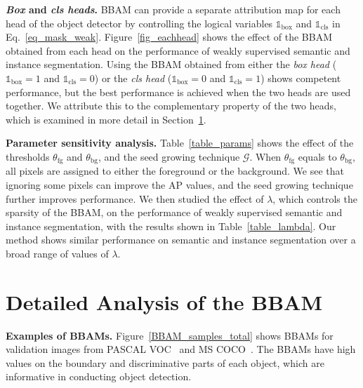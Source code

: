 \documentclass[final]{cvpr}
\begin{document}
\textbf{\textit{Box} and \textit{cls heads}.}
BBAM can provide a separate attribution map for each head of the object detector by controlling the logical variables $\mathbb{1}_{\text{box}}$ and $\mathbb{1}_{\text{cls}}$ in Eq.~\ref{eq_mask_weak}.
Figure~\ref{fig_eachhead} shows the effect of the BBAM obtained from each head on the performance of weakly supervised semantic and instance segmentation. Using the BBAM obtained from either the \textit{box head} ($\mathbb{1}_{\text{box}}=1$ and $\mathbb{1}_{\text{cls}}=0$) or the \textit{cls head} ($\mathbb{1}_{\text{box}}=0$ and $\mathbb{1}_{\text{cls}}=1$) shows competent performance, but the best performance is achieved when the two heads are used together. 
We attribute this to the complementary property of the two heads, which is examined in more detail in Section~\ref{sec_analysis}.







\textbf{Parameter sensitivity analysis.} Table~\ref{table_params} shows the effect of the thresholds $\theta_{\text{fg}}$ and $\theta_{\text{bg}}$, and the seed growing technique $\mathcal{G}$.
When $\theta_{\text{fg}}$ equals to $\theta_{\text{bg}}$, all pixels are assigned to either the foreground or the background.
We see that ignoring some pixels can improve the AP values, and the seed growing technique further improves performance.
We then studied the effect of $\lambda$, which controls the sparsity of the BBAM, on the performance of weakly supervised semantic and instance segmentation, with the results shown in Table~\ref{table_lambda}. 
Our method shows similar performance on semantic and instance segmentation over a broad range of values of $\lambda$.




\section{Detailed Analysis of the BBAM}\label{sec_analysis}



\textbf{Examples of BBAMs.}
Figure~\ref{BBAM_samples_total} shows BBAMs for validation images from PASCAL VOC~\cite{everingham2010pascal} and MS COCO~\cite{lin2014microsoft}.
The BBAMs have high values on the boundary and discriminative parts of each object, which are informative in conducting object detection.
\end{document}
